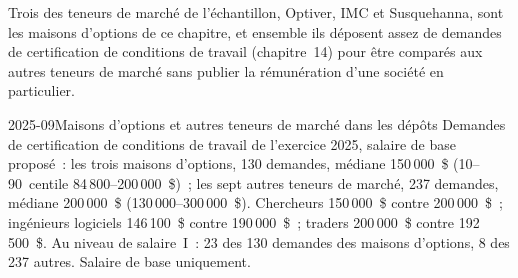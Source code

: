 Trois des teneurs de marché de l'échantillon, Optiver, IMC et Susquehanna, sont les maisons d'options de ce chapitre, et
ensemble ils déposent assez de demandes de certification de conditions de travail (chapitre~14) pour être comparés aux autres teneurs de marché sans
publier la rémunération d'une société en particulier.

\begin{dated}{2025-09}{Maisons d'options et autres teneurs de marché dans les dépôts}\label{dat:in:the-options-market-making-houses:lca}
Demandes de certification de conditions de travail de l'exercice 2025, salaire de base proposé~: les trois maisons d'options, 130 demandes, médiane 150\,000~\$
(10--90~centile 84\,800--200\,000~\$)~; les sept autres teneurs de marché, 237 demandes, médiane 200\,000~\$
(130\,000--300\,000~\$). Chercheurs 150\,000~\$ contre 200\,000~\$~; ingénieurs logiciels 146\,100~\$ contre 190\,000~\$~;
traders 200\,000~\$ contre 192\,500~\$. Au niveau de salaire~I~: 23 des 130 demandes des maisons d'options, 8 des 237 autres.
Salaire de base uniquement.
\end{dated}

